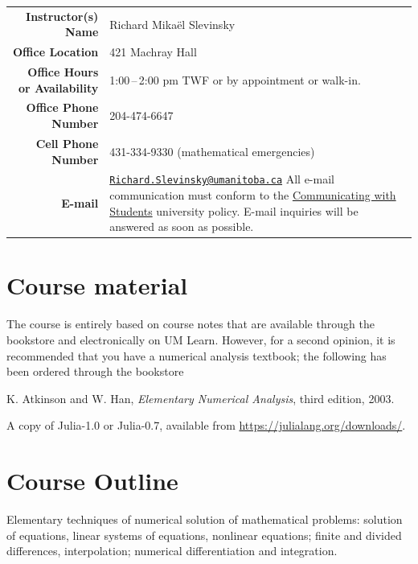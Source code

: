 \documentclass[12pt]{article}
\newlength{\infoTableSpace}
\begin{document}
\noindent
\begin{tabular*}{\linewidth}{r@{\hspace{\infoTableSpace}}l}
	\toprule
	\textbf{Instructor(s) Name} 			& Richard Mika\"el Slevinsky 	\\ 
	\textbf{Office Location}				& 421 Machray Hall	\\
	\textbf{Office Hours or Availability} & 1:00\,--\,2:00 pm TWF or by appointment or walk-in.\\
	\textbf{Office Phone Number} 			& 204-474-6647	\\
	\textbf{Cell Phone Number} 			& 431-334-9330 (mathematical emergencies) \\
	\textbf{E-mail}	& \begin{minipage}[t]{0.65\linewidth}	
			\href{mailto:Richard.Slevinsky@umanitoba.ca}{\texttt{Richard.Slevinsky@umanitoba.ca}}
			All e-mail communication must conform to the 
			\href{http://umanitoba.ca/admin/governance/media/Electronic_Communication_with_Students_Policy_-_2014_06_05.pdf}{Communicating with Students} university policy. E-mail inquiries will be answered as soon as possible.			
		\end{minipage} \\
	\bottomrule
\end{tabular*}


\section{Course material}

The course is entirely based on course notes that are available through the bookstore and electronically on UM Learn. However, for a second opinion, it is recommended that you have a numerical analysis textbook; the following has been ordered through the bookstore

K. Atkinson and W. Han, {\em Elementary Numerical Analysis}, third edition, 2003.

A copy of {\sc Julia-1.0} or {\sc Julia-0.7}, available from \href{https://julialang.org/downloads/}{https://julialang.org/downloads/}.

\section{Course Outline}

Elementary techniques of numerical solution of mathematical problems: solution of equations, linear systems of equations, nonlinear equations; finite and divided differences, interpolation; numerical differentiation and integration.
\end{document}
